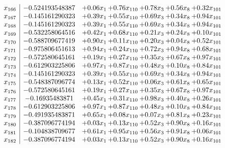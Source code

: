 \documentclass[8pt]{article}
\begin{document}
\[\begin{array}{c| c c@{\hskip 2pt} c@{\hskip 2pt} c@{\hskip 2pt} c@{\hskip 2pt} c@{\hskip 2pt} }
 x_{166}   &  -0.524193548387 & +  0.06 x_{1} & +  0.76 x_{110} & +  0.78 x_{3} & +  0.56 x_{8} & +  0.32 x_{101}\\
 x_{167}   &  -0.145161290323 & +  0.39 x_{1} & +  0.55 x_{110} & +  0.69 x_{3} & +  0.34 x_{8} & +  0.94 x_{101}\\
 x_{168}   &  -0.145161290323 & +  0.39 x_{1} & +  0.55 x_{110} & +  0.69 x_{3} & +  0.34 x_{8} & +  0.94 x_{101}\\
 x_{169}   &  -0.532258064516 & +  0.42 x_{1} & +  0.68 x_{110} & +  0.21 x_{3} & +  0.24 x_{8} & +  0.10 x_{101}\\
 x_{170}   &  -0.588709677419 & +  0.90 x_{1} & +  0.11 x_{110} & +  0.20 x_{3} & +  0.04 x_{8} & +  0.52 x_{101}\\
 x_{171}   &  -0.975806451613 & +  0.94 x_{1} & +  0.24 x_{110} & +  0.72 x_{3} & +  0.94 x_{8} & +  0.68 x_{101}\\
 x_{172}   &  -0.572580645161 & +  0.19 x_{1} & +  0.27 x_{110} & +  0.35 x_{3} & +  0.67 x_{8} & +  0.97 x_{101}\\
 x_{173}   &  -0.612903225806 & +  0.97 x_{1} & +  0.87 x_{110} & +  0.48 x_{3} & +  0.10 x_{8} & +  0.84 x_{101}\\
 x_{174}   &  -0.145161290323 & +  0.39 x_{1} & +  0.55 x_{110} & +  0.69 x_{3} & +  0.34 x_{8} & +  0.94 x_{101}\\
 x_{175}   &  -0.548387096774 & +  0.13 x_{1} & +  0.52 x_{110} & +  0.06 x_{3} & +  0.61 x_{8} & +  0.65 x_{101}\\
 x_{176}   &  -0.572580645161 & +  0.19 x_{1} & +  0.27 x_{110} & +  0.35 x_{3} & +  0.67 x_{8} & +  0.97 x_{101}\\
 x_{177}   &  -0.16935483871 & +  0.45 x_{1} & +  0.31 x_{110} & +  0.98 x_{3} & +  0.40 x_{8} & +  0.26 x_{101}\\
 x_{178}   &  -0.612903225806 & +  0.97 x_{1} & +  0.87 x_{110} & +  0.48 x_{3} & +  0.10 x_{8} & +  0.84 x_{101}\\
 x_{179}   &  -0.491935483871 & +  0.65 x_{1} & +  0.08 x_{110} & +  0.07 x_{3} & +  0.81 x_{8} & +  0.23 x_{101}\\
 x_{180}   &  -0.387096774194 & +  0.03 x_{1} & +  0.13 x_{110} & +  0.52 x_{3} & +  0.90 x_{8} & +  0.16 x_{101}\\
 x_{181}   &  -0.104838709677 & +  0.61 x_{1} & +  0.95 x_{110} & +  0.56 x_{3} & +  0.91 x_{8} & +  0.06 x_{101}\\
 x_{182}   &  -0.387096774194 & +  0.03 x_{1} & +  0.13 x_{110} & +  0.52 x_{3} & +  0.90 x_{8} & +  0.16 x_{101}\\

\end{array}\]
\end{document}
